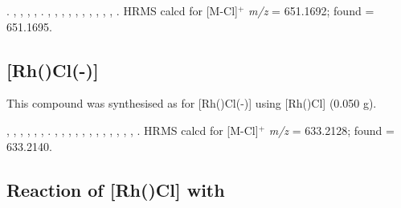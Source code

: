 .
,
,
,
,
.
,
,
,
,
,
,
,
,
,
,
.
HRMS calcd for  [M-Cl]$^+$ \emph{m/z} = 651.1692; found = 651.1695.


\subsection*{\texorpdfstring{[Rh(\tBuxantphos)Cl(-)]} R}


This compound was synthesised as for [Rh(\tBusixantphos)Cl(-)] using [Rh(\tBuxantphos)Cl] (0.050 g).

\begin{sloppypar}
,
,
,
,
,
,
.
,
,
,
,
,
,
,
,
,
,
,
,
.
HRMS calcd for  [M-Cl]$^+$ \emph{m/z} = 633.2128; found = 633.2140.
\end{sloppypar}

\subsection*{Reaction of [Rh(\tBusixantphos)Cl] with \texorpdfstring{} O}

